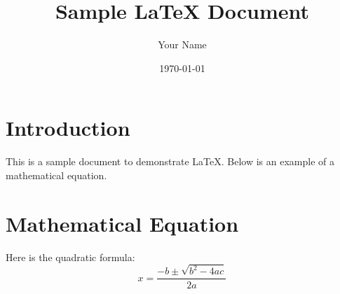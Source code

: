 \documentclass{article}
\title{Sample LaTeX Document}
\author{Your Name}
\date{\today}
\begin{document}
\maketitle

\section{Introduction}
This is a sample document to demonstrate LaTeX. Below is an example of a mathematical equation.

\section{Mathematical Equation}
Here is the quadratic formula:
\begin{equation}
x = \frac{-b \pm \sqrt{b^2 - 4ac}}{2a}
\end{equation}
\end{document}

